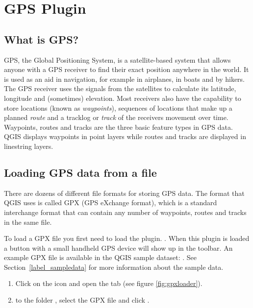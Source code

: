 
\section{GPS Plugin}\label{label_plugingps}


\subsection{What is GPS?}\label{whatsgps}

GPS, the Global Positioning System, is a satellite-based system that allows anyone with a GPS receiver to find their exact position anywhere in the world.
It is used as an aid in navigation, for example in airplanes, in boats and by hikers.
The GPS receiver uses the signals from the satellites to calculate its latitude, longitude and (sometimes) elevation.
Most receivers also have the capability to store locations (known as \emph{waypoints}), sequences of locations that make up a planned \emph{route} and a tracklog or \emph{track} of the receivers movement over time.
Waypoints, routes and tracks are the three basic feature types in GPS data.
QGIS displays waypoints in point layers while routes and tracks are displayed in linestring layers.

\subsection{Loading GPS data from a file}\label{label_loadgps}

There are dozens of different file formats for storing GPS data.
The format that QGIS uses is called GPX (GPS eXchange format), which is a standard interchange format that can contain any number of waypoints, routes and tracks in the same file.

To load a GPX file you first need to load the plugin.
 \arrow {} \arrow {}. When this plugin is loaded a button with a
small handheld GPS device will show up in the toolbar. An example GPX file is
available in the QGIS sample dataset:
. See
Section~\ref{label_sampledata} for more information about the sample data.

\begin{enumerate}
\item Click on the  icon and open the
 tab (see figure \ref{fig:gpxloader}).
\item {} to the folder ,
select the GPX file  and click .
\end{enumerate}

